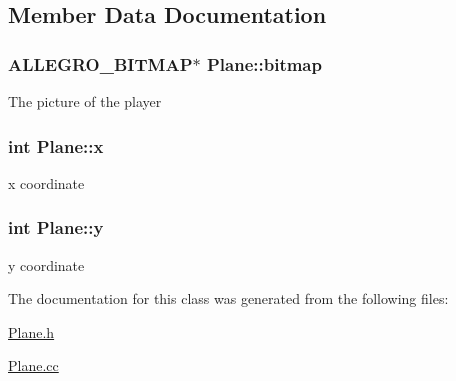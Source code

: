 \subsection{Member Data Documentation}
\hypertarget{classPlane_a5f3754de26e2b832d79fd83752b0f2df}{
\subsubsection[{bitmap}]{\setlength{\rightskip}{0pt plus 5cm}ALLEGRO\_\-BITMAP$\ast$ {\bf Plane::bitmap}}}
\label{classPlane_a5f3754de26e2b832d79fd83752b0f2df}
The picture of the player \hypertarget{classPlane_a31fa7567ef20b26ca2cafad6f17a776b}{
\subsubsection[{x}]{\setlength{\rightskip}{0pt plus 5cm}int {\bf Plane::x}}}
\label{classPlane_a31fa7567ef20b26ca2cafad6f17a776b}
x coordinate \hypertarget{classPlane_ace518f4f4d6d29db13e41276a327c323}{
\subsubsection[{y}]{\setlength{\rightskip}{0pt plus 5cm}int {\bf Plane::y}}}
\label{classPlane_ace518f4f4d6d29db13e41276a327c323}
y coordinate 

The documentation for this class was generated from the following files:\begin{DoxyCompactItemize}
\item 
\hyperlink{Plane_8h}{Plane.h}\item 
\hyperlink{Plane_8cc}{Plane.cc}\end{DoxyCompactItemize}

